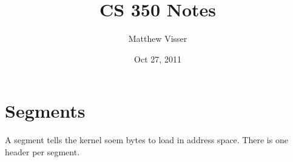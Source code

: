 \documentclass[12pt]{article}
\begin{document}
\title{CS 350 Notes}
\author{Matthew Visser}
\date{Oct 27, 2011}
\maketitle

\section{Segments}

A segment tells the kernel soem bytes to load in address space.  There is one
header per segment.
\end{document}
